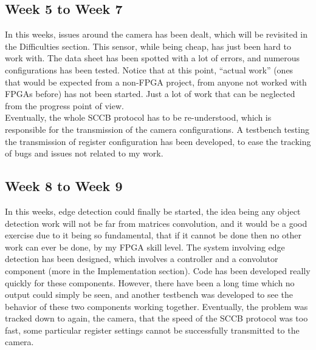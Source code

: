 \documentclass{article}
\begin{document}
	\subsection{Week 5 to Week 7}
		In this weeks, issues around the camera has been dealt, which will be revisited in the Difficulties section. This sensor, while being cheap, has just been hard to work with. The data sheet has been spotted with a lot of errors, and numerous configurations has been tested. Notice that at this point, ``actual work'' (ones that would be expected from a non-FPGA project, from anyone not worked with FPGAs before) has not been started. Just a lot of work that can be neglected from the progress point of view.
	\\
		
		Eventually, the whole SCCB protocol has to be re-understood, which is responsible for the transmission of the camera configurations. A testbench testing the transmission of register configuration has been developed, to ease the tracking of bugs and issues not related to my work.
	
	\subsection{Week 8 to Week 9}
		In this weeks, edge detection could finally be started, the idea being any object detection work will not be far from matrices convolution, and it would be a good exercise due to it being so fundamental, that if it cannot be done then no other work can ever be done, by my FPGA skill level. The system involving edge detection has been designed, which involves a controller and a convolutor component (more in the Implementation section). Code has been developed really quickly for these components. However, there have been a long time which no output could simply be seen, and another testbench was developed to see the behavior of these two components working together. Eventually, the problem was tracked down to again, the camera, that the speed of the SCCB protocol was too fast, some particular register settings cannot be successfully transmitted to the camera.
	
\end{document}
